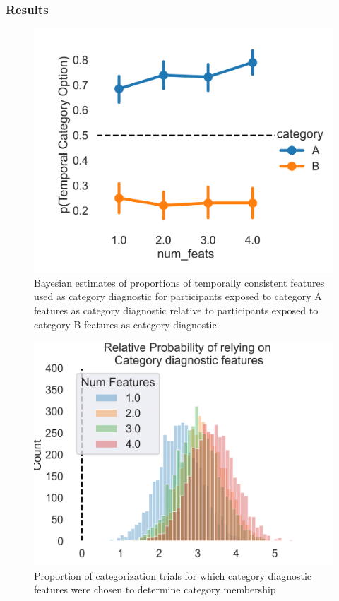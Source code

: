 \subsubsection*{Results}

\begin{figure}[h]
    \centering
    \label{fig:exp5-category-proportions}
    \caption{Bayesian estimates of proportions of temporally consistent features used as category diagnostic for participants exposed to category A features as category diagnostic relative to participants exposed to category B features as category diagnostic.}
    \includegraphics[width = \textwidth]{chapter_notebooks/chapter_4/figures/exp5_proportion_results.png}
\end{figure}

\begin{figure}[h]
    \centering
    \label{fig:exp5-bayesian-estimates-proportions}
    \caption{Proportion of categorization trials for which category diagnostic features were chosen to determine category membership}
    \includegraphics[width = \textwidth]{chapter_notebooks/chapter_4/figures/exp5_bayesmodel_res.png}
\end{figure}


